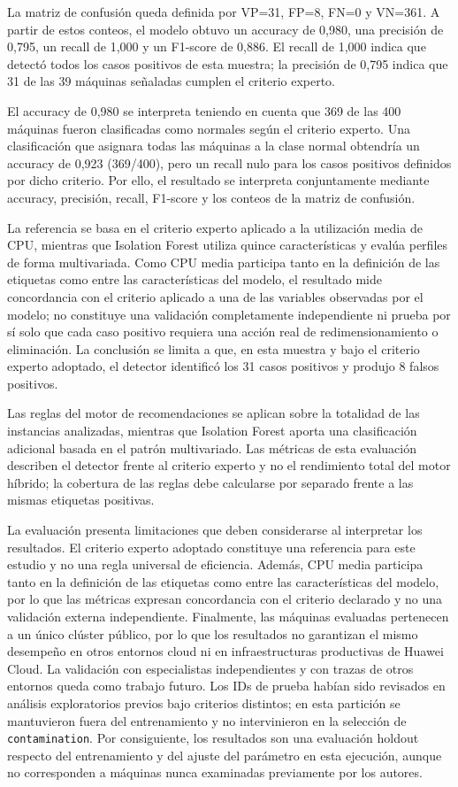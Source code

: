 La matriz de confusión queda definida por VP=31, FP=8, FN=0 y VN=361. A partir de estos conteos, el modelo obtuvo un accuracy de 0,980, una precisión de 0,795, un recall de 1,000 y un F1-score de 0,886. El recall de 1,000 indica que detectó todos los casos positivos de esta muestra; la precisión de 0,795 indica que 31 de las 39 máquinas señaladas cumplen el criterio experto.

El accuracy de 0,980 se interpreta teniendo en cuenta que 369 de las 400 máquinas fueron clasificadas como normales según el criterio experto. Una clasificación que asignara todas las máquinas a la clase normal obtendría un accuracy de 0,923 (369/400), pero un recall nulo para los casos positivos definidos por dicho criterio. Por ello, el resultado se interpreta conjuntamente mediante accuracy, precisión, recall, F1-score y los conteos de la matriz de confusión.

La referencia se basa en el criterio experto aplicado a la utilización media de CPU, mientras que Isolation Forest utiliza quince características y evalúa perfiles de forma multivariada. Como CPU media participa tanto en la definición de las etiquetas como entre las características del modelo, el resultado mide concordancia con el criterio aplicado a una de las variables observadas por el modelo; no constituye una validación completamente independiente ni prueba por sí solo que cada caso positivo requiera una acción real de redimensionamiento o eliminación. La conclusión se limita a que, en esta muestra y bajo el criterio experto adoptado, el detector identificó los 31 casos positivos y produjo 8 falsos positivos.

Las reglas del motor de recomendaciones se aplican sobre la totalidad de las instancias analizadas, mientras que Isolation Forest aporta una clasificación adicional basada en el patrón multivariado. Las métricas de esta evaluación describen el detector frente al criterio experto y no el rendimiento total del motor híbrido; la cobertura de las reglas debe calcularse por separado frente a las mismas etiquetas positivas.

La evaluación presenta limitaciones que deben considerarse al interpretar los resultados. El criterio experto adoptado constituye una referencia para este estudio y no una regla universal de eficiencia. Además, CPU media participa tanto en la definición de las etiquetas como entre las características del modelo, por lo que las métricas expresan concordancia con el criterio declarado y no una validación externa independiente. Finalmente, las máquinas evaluadas pertenecen a un único clúster público, por lo que los resultados no garantizan el mismo desempeño en otros entornos cloud ni en infraestructuras productivas de Huawei Cloud. La validación con especialistas independientes y con trazas de otros entornos queda como trabajo futuro. Los IDs de prueba habían sido revisados en análisis exploratorios previos bajo criterios distintos; en esta partición se mantuvieron fuera del entrenamiento y no intervinieron en la selección de \texttt{contamination}. Por consiguiente, los resultados son una evaluación holdout respecto del entrenamiento y del ajuste del parámetro en esta ejecución, aunque no corresponden a máquinas nunca examinadas previamente por los autores.

